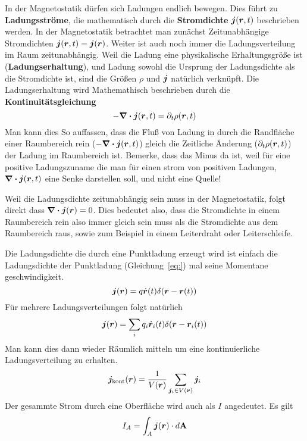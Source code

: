 In der Magnetostatik dürfen sich Ladungen endlich bewegen. Dies führt zu
\textbf{Ladungsströme}, die mathematisch durch die \textbf{Stromdichte}
\(\vb*j(\vb*r, t)\) beschrieben werden. In der Magnetostatik betrachtet man
zunächst Zeitunabhängige Stromdichten $\vb*j(\vb*r, t)=\vb*j(\vb*r)$. Weiter
ist auch noch immer die Ladungsverteilung im Raum zeitunabhängig. Weil die
Ladung eine physikalische Erhaltungsgröße ist (\textbf{Ladungserhaltung}),
und Ladung sowohl die Ursprung der Ladungsdichte als die Stromdichte ist,
sind die Größen $\rho$ und $\vb*j$ natürlich verknüpft. Die Ladungserhaltung
wird Mathemathisch beschrieben durch die \textbf{Kontinuitätsgleichung}
\begin{equation}
  -\div\vb*j(\vb*r, t) = \partial_t \rho(\vb*r, t)
\end{equation}
Man kann dies So auffassen, dass die Fluß von Ladung in durch die Randfläche
einer Raumbereich rein (\(-\div\vb*j(\vb*r, t)\)) gleich die Zeitliche Änderung
(\(\partial_t\rho(\vb*r, t)\)) der Ladung im Raumbereich ist. Bemerke, dass das Minus da ist, weil für eine positive Ladungszuname die man für einen strom
von positiven Ladungen, $\div\vb*j(\vb*r, t)$ eine Senke
darstellen soll, und nicht eine Quelle!

Weil die Ladungsdichte zeitunabhängig sein muss in der Magnetostatik, folgt
direkt dass $\div\vb*j(\vb*r)=0$. Dies bedeutet also, dass die Stromdichte
in einem Raumbereich rein also immer gleich sein muss als die Stromdichte aus
dem Raumbereich raus, sowie zum Beispiel in einem Leiterdraht oder Leiterschleife.

Die Ladungsdichte die durch eine Punktladung erzeugt wird ist einfach die
Ladungsdichte der Punktladung (Gleichung~\ref{eq:}) mal seine Momentane geschwindigkeit.
\begin{equation*}
  \vb*j(\vb*r) = q \dot{\vb*r}(t) \delta(\vb*r -\vb*r(t))
\end{equation*}
Für mehrere Ladungsverteilungen folgt natürlich
\begin{equation}
  \vb*j(\vb*r) = \sum_i q_i \dot{\vb*r}_i(t) \delta(\vb*r-\vb*r_i(t))
\end{equation}
Man kann dies dann wieder Räumlich mitteln um eine kontinuierliche Ladungsverteilung zu erhalten.
\begin{equation}
  \vb*j_{\text{kont}}(\vb*r) = \frac{1}{V(\vb*r)}\sum_{\vb*j_i\in V(\vb*r)}\vb*j_i 
\end{equation}
Der gesammte Strom durch eine Oberfläche wird auch als $I$ angedeutet. Es
gilt
\begin{equation}
  I_A = \int_A \vb*j(\vb*r) \cdot d\vb A
\end{equation}
